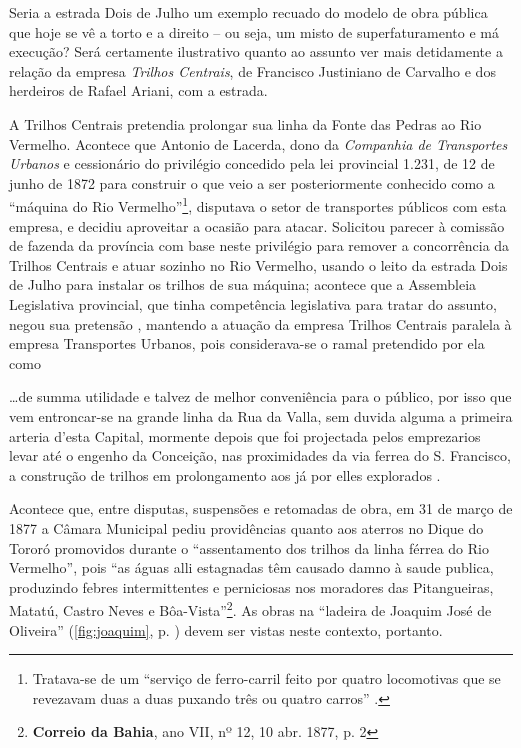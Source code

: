 Seria a estrada Dois de Julho um exemplo recuado do modelo de obra pública que hoje se vê a torto e a direito -- ou seja, um misto de superfaturamento e má execução? Será certamente ilustrativo quanto ao assunto ver mais detidamente a relação da empresa \textit{Trilhos Centrais}, de Francisco Justiniano de Carvalho e dos herdeiros de Rafael Ariani, com a estrada.

A Trilhos Centrais pretendia prolongar sua linha da Fonte das Pedras ao Rio Vermelho. Acontece que Antonio de Lacerda, dono da \textit{Companhia de Transportes Urbanos} e cessionário do privilégio concedido pela lei provincial 1.231, de 12 de junho de 1872 para construir o que veio a ser posteriormente conhecido como a ``máquina do Rio Vermelho''\footnote{Tratava-se de um ``serviço de ferro-carril feito por quatro locomotivas que se revezavam duas a duas puxando três ou quatro carros'' \cite[p.~90]{trinchao_parafuso_2010}.}, disputava o setor de transportes públicos com esta empresa, e decidiu aproveitar a ocasião para atacar. Solicitou parecer à comissão de fazenda da província com base neste privilégio para remover a concorrência da Trilhos Centrais e atuar sozinho no Rio Vermelho, usando o leito da estrada Dois de Julho para instalar os trilhos de sua máquina; acontece que a Assembleia Legislativa provincial, que tinha competência legislativa para tratar do assunto, negou sua pretensão \cite[p.~250]{bahia_relatassleg_1875}, mantendo a atuação da empresa Trilhos Centrais paralela à empresa Transportes Urbanos, pois considerava-se o ramal pretendido por ela como

\begin{citacao}
\dots de summa utilidade e talvez de melhor conveniência para o público, por isso que vem entroncar-se na grande linha da Rua da Valla, sem duvida alguma a primeira arteria d'esta Capital, mormente depois que foi projectada pelos emprezarios levar até o engenho da Conceição, nas proximidades da via ferrea do S. Francisco, a construção de trilhos em prolongamento aos já por elles explorados \cite[p.~169]{bahia_rpe_1874}.
\end{citacao}

Acontece que, entre disputas, suspensões e retomadas de obra, em 31 de março de 1877 a Câmara Municipal pediu providências quanto aos aterros no Dique do Tororó promovidos durante o ``assentamento dos trilhos da linha férrea do Rio Vermelho'', pois ``as águas alli estagnadas têm causado damno à saude publica, produzindo febres intermittentes e perniciosas nos moradores das Pitangueiras, Matatú, Castro Neves e Bôa-Vista''\footnote{\textbf{Correio da Bahia}, ano VII, nº 12, 10 abr. 1877, p. 2}. As obras na ``ladeira de Joaquim José de Oliveira'' (\autoref{fig:joaquim}, p. \pageref{fig:joaquim}) devem ser vistas neste contexto, portanto. 

